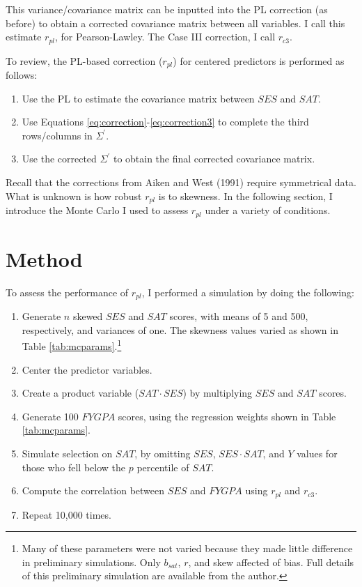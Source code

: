 \documentclass[english,man]{apa6}
\providecommand{\tightlist}{%
  \setlength{\itemsep}{0pt}\setlength{\parskip}{0pt}}
\newcounter{author}
\theoremstyle{definition}
\theoremstyle{definition}
\theoremstyle{remark}
\begin{document}
This variance/covariance matrix can be inputted into the PL correction
(as before) to obtain a corrected covariance matrix between all
variables. I call this estimate \(r_{pl}\), for Pearson-Lawley. The Case
III correction, I call \(r_{c3}\).

To review, the PL-based correction (\(r_{pl}\)) for centered predictors
is performed as follows:

\begin{enumerate}
\item Use the PL to estimate the covariance matrix between $SES$ and $SAT$.
\item Use Equations \ref{eq:correction}-\ref{eq:correction3} to complete the third rows/columns in $\Sigma^\prime$.
\item Use the corrected $\Sigma^\prime$ to obtain the final corrected covariance matrix. 
\end{enumerate}

Recall that the corrections from Aiken and West (1991) require
symmetrical data. What is unknown is how robust \(r_{pl}\) is to
skewness. In the following section, I introduce the Monte Carlo I used
to assess \(r_{pl}\) under a variety of conditions.

\section{Method}\label{method}

To assess the performance of \(r_{pl}\), I performed a simulation by
doing the following:

\begin{enumerate}
\def\labelenumi{(\arabic{enumi})}
\tightlist
\item
  Generate \(n\) skewed \(SES\) and \(SAT\) scores, with means of 5 and
  500, respectively, and variances of one. The skewness values varied as
  shown in Table \ref{tab:mcparams}.\footnote{Many of these parameters
    were not varied because they made little difference in preliminary
    simulations. Only \(b_{sat}\), \(r\), and skew affected of bias.
    Full details of this preliminary simulation are available from the
    author.}
\item
  Center the predictor variables.
\item
  Create a product variable (\(SAT\cdot SES\)) by multiplying \(SES\)
  and \(SAT\) scores.
\item
  Generate 100 \(FYGPA\) scores, using the regression weights shown in
  Table \ref{tab:mcparams}.
\item
  Simulate selection on \(SAT\), by omitting \(SES\), \(SES\cdot SAT\),
  and \(Y\) values for those who fell below the \(p\) percentile of
  \(SAT\).
\item
  Compute the correlation between \(SES\) and \(FYGPA\) using \(r_{pl}\)
  and \(r_{c3}\).
\item
  Repeat 10,000 times.
\end{enumerate}
\end{document}
